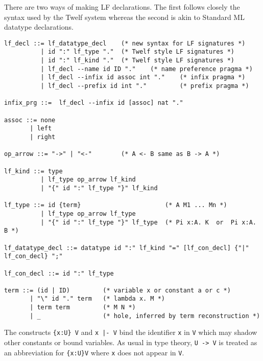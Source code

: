 \documentclass[11pt]{article}
\begin{document}
There are two ways of making LF declarations. The first follows closely the syntax used by the Twelf system whereas the second is akin to Standard ML datatype declarations.

\begin{verbatim}
lf_decl ::= lf_datatype_decl    (* new syntax for LF signatures *)
          | id ":" lf_type "."  (* Twelf style LF signatures *)
          | id ":" lf_kind "."  (* Twelf style LF signatures *)
          | lf_decl --name id ID "."    (* name preference pragma *)
          | lf_decl --infix id assoc int "."    (* infix pragma *)
          | lf_decl --prefix id int "."         (* prefix pragma *)

infix_prg ::=  lf_decl --infix id [assoc] nat "."

assoc ::= none
	   | left
	   | right

op_arrow ::= "->" | "<-"        (* A <- B same as B -> A *)

lf_kind ::= type
          | lf_type op_arrow lf_kind
          | "{" id ":" lf_type "}" lf_kind

lf_type ::= id {term}                       (* A M1 ... Mn *)
          | lf_type op_arrow lf_type
          | "{" id ":" lf_type "}" lf_type  (* Pi x:A. K  or  Pi x:A. B *)

lf_datatype_decl ::= datatype id ":" lf_kind "=" [lf_con_decl] {"|" lf_con_decl} ";"

lf_con_decl ::= id ":" lf_type

term ::= (id | ID)         (* variable x or constant a or c *)
       | "\" id "." term   (* lambda x. M *)
       | term term         (* M N *)
       | _                 (* hole, inferred by term reconstruction *)
\end{verbatim}
The constructs \texttt{\{x:U\} V} and \texttt{x |- V} bind the identifier \texttt{x} in \texttt{V} which may shadow other constants or bound variables. As usual in type theory, \texttt{U -> V} is treated as an abbreviation for \texttt{\{x:U\}V} where \texttt{x} does not appear in \texttt{V}.
\end{document}
